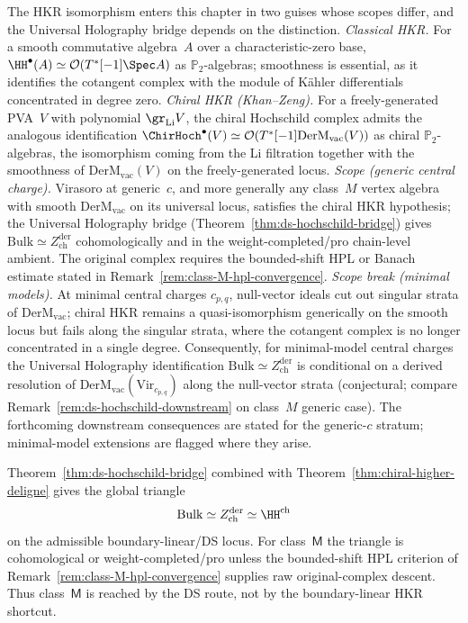 \begin{remark}%
\label{rem:hkr-scope-and-chiral-analogue}%
%
%
The HKR isomorphism enters this chapter in two guises whose scopes
differ, and the Universal Holography bridge depends on the distinction.
\emph{Classical HKR.} For a smooth commutative algebra~$A$ over a
characteristic-zero base,
$\HH^{\bullet}(A)\simeq\mathcal{O}(T^*[-1]\Spec A)$
as $\mathbb{P}_2$-algebras; smoothness is essential, as it identifies
the cotangent complex with the module of K\"ahler differentials
concentrated in degree zero.
\emph{Chiral HKR (Khan--Zeng).} For a freely-generated PVA~$V$ with
polynomial $\gr_{\mathrm{Li}}V$, the chiral Hochschild complex admits
the analogous identification
$\ChirHoch^{\bullet}(V)\simeq
 \mathcal{O}(T^*[-1]\mathrm{DerM}_{\mathrm{vac}}(V))$
as chiral $\mathbb{P}_2$-algebras, the isomorphism coming from the
Li filtration together with the smoothness of $\mathrm{DerM}_{\mathrm{vac}}(V)$
on the freely-generated locus.
\emph{Scope (generic central charge).} Virasoro at generic~$c$, and
more generally any class~$M$ vertex algebra with smooth
$\mathrm{DerM}_{\mathrm{vac}}$ on its universal locus, satisfies the
chiral HKR hypothesis; the Universal Holography bridge
(Theorem~\ref{thm:ds-hochschild-bridge}) gives
$\mathrm{Bulk}\simeq Z^{\mathrm{der}}_{\mathrm{ch}}$ cohomologically
and in the weight-completed/pro chain-level ambient.  The original
complex requires the bounded-shift HPL or Banach estimate stated in
Remark~\ref{rem:class-M-hpl-convergence}.
\emph{Scope break (minimal models).} At minimal central charges
$c_{p,q}$, null-vector ideals cut out singular strata of
$\mathrm{DerM}_{\mathrm{vac}}$; chiral HKR remains a quasi-isomorphism
generically on the smooth locus but fails along the singular strata,
where the cotangent complex is no longer concentrated in a single
degree. Consequently, for minimal-model central charges the Universal
Holography identification $\mathrm{Bulk}\simeq Z^{\mathrm{der}}_{\mathrm{ch}}$
is conditional on a derived resolution of
$\mathrm{DerM}_{\mathrm{vac}}(\mathrm{Vir}_{c_{p,q}})$ along the
null-vector strata (conjectural; compare
Remark~\ref{rem:ds-hochschild-downstream} on class~$M$ generic case).
The forthcoming downstream consequences are stated for the generic-$c$
stratum; minimal-model extensions are flagged where they arise.
\end{remark}

\begin{remark}%
\label{rem:ds-hochschild-downstream}%
Theorem~\ref{thm:ds-hochschild-bridge} combined with
Theorem~\ref{thm:chiral-higher-deligne} gives the global triangle
\[
\mathrm{Bulk}\simeq Z^{\mathrm{der}}_{\mathrm{ch}}\simeq
\HH^{\mathrm{ch}}
\]
on the admissible boundary-linear/DS locus. For class~$\mathsf M$ the
triangle is cohomological or weight-completed/pro unless the
bounded-shift HPL criterion of
Remark~\ref{rem:class-M-hpl-convergence} supplies raw original-complex
descent. Thus class~$\mathsf M$ is reached by the DS route, not by the
boundary-linear HKR shortcut.
\end{remark}


